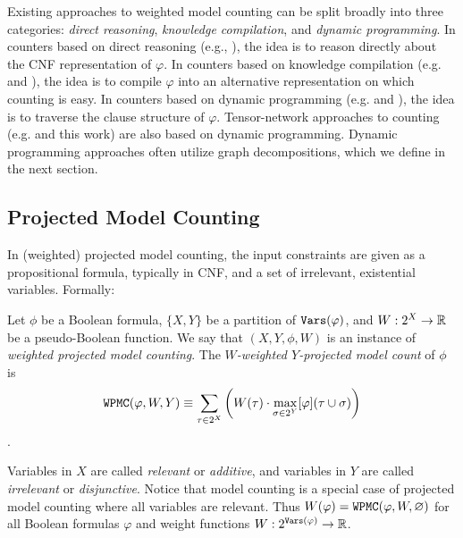 Existing approaches to weighted model counting can be split broadly into three categories: \emph{direct reasoning}, \emph{knowledge compilation}, and \emph{dynamic programming}. In counters based on direct reasoning (e.g.,  \cite{SBK05}), the idea is to reason directly about the CNF representation of $\varphi$. In counters based on knowledge compilation (e.g.  \cite{OD15} and  \cite{LM17}), the idea is to compile $\varphi$ into an alternative representation on which counting is easy. In counters based on dynamic programming (e.g.  \cite{DPV20} and  \cite{FHWZ18,FHZ19}), the idea is to traverse the clause structure of $\varphi$. Tensor-network approaches to counting (e.g.  \cite{DDV19} and this work) are also based on dynamic programming. Dynamic programming approaches often utilize graph decompositions, which we define in the next section. 

\subsection{Projected Model Counting}
In (weighted) projected model counting, the input constraints are given as a propositional formula, typically in CNF, and a set of irrelevant, existential variables.
Formally:
\begin{definition}
	Let $\phi$ be a Boolean formula, $\{X, Y\}$ be a partition of $\texttt{\upshape Vars}(\varphi)$, and $W: 2^X \to \mathbb{R}$ be a pseudo-Boolean function. We say that $(X, Y, \phi, W)$ is an instance of \emph{weighted projected model counting}.
	The \emph{$W$-weighted $Y$-projected model count} of $\phi$ is
	$$\texttt{\upshape WPMC}(\varphi, W, Y) \equiv \sum_{\tau \in 2^X} \left(  W(\tau) \cdot \max_{\sigma \in 2^Y} [\varphi](\tau \cup \sigma)  \right)$$.
\end{definition}

Variables in $X$ are called \emph{relevant} or \emph{additive}, and variables in $Y$ are called \emph{irrelevant} or \emph{disjunctive}. 
Notice that model counting is a special case of projected model counting where all variables are relevant. Thus $W(\varphi) = \texttt{\upshape WPMC}(\varphi, W, \varnothing)$ for all Boolean formulas $\varphi$ and weight functions $W: 2^{\texttt{\upshape Vars}(\varphi)} \rightarrow \mathbb{R}$. 
